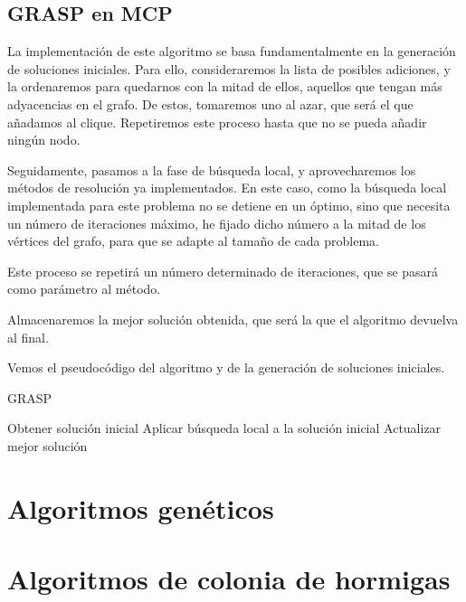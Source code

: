 \subsection{GRASP en MCP}

La implementación de este algoritmo se basa fundamentalmente en la generación de soluciones iniciales.
Para ello, consideraremos la lista de posibles adiciones, y la ordenaremos para quedarnos con la mitad
de ellos, aquellos que tengan más adyacencias en el grafo. De estos, tomaremos uno al azar, que será
el que añadamos al clique. Repetiremos este proceso hasta que no se pueda añadir ningún nodo.

Seguidamente, pasamos a la fase de búsqueda local, y aprovecharemos los métodos de resolución ya implementados.
En este caso, como la búsqueda local implementada para este problema no se detiene en un óptimo, sino que
necesita un número de iteraciones máximo, he fijado dicho número a la mitad de los vértices del grafo, para
que se adapte al tamaño de cada problema.

Este proceso se repetirá un número determinado de iteraciones, que se pasará como parámetro al método.

Almacenaremos la mejor solución obtenida, que será la que el algoritmo devuelva al final.

Vemos el pseudocódigo del algoritmo y de la generación de soluciones iniciales.

\begin{algorithm}[H]
\caption{GRASP}
  \begin{algorithmic}
  \Repeat
    \State Obtener solución inicial
    \State Aplicar búsqueda local a la solución inicial
    \State Actualizar mejor solución
  \end{algorithmic}
\end{algorithm}


\section{Algoritmos genéticos}

\section{Algoritmos de colonia de hormigas}
